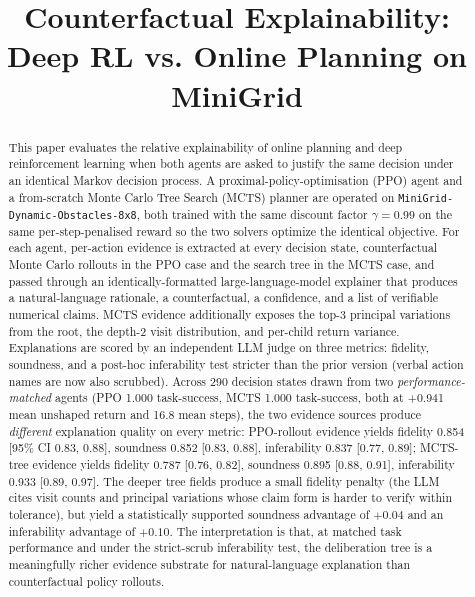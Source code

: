 \documentclass[conference]{IEEEtran}
\begin{document}
\title{Counterfactual Explainability:\\Deep RL vs. Online Planning on MiniGrid}

\author{
\and
{}
}

\maketitle

\begin{abstract}
This paper evaluates the relative explainability of online planning
and deep reinforcement learning when both agents are asked to justify
the same decision under an identical Markov decision process. A
proximal-policy-optimisation (PPO) agent and a from-scratch Monte
Carlo Tree Search (MCTS) planner are operated on
\texttt{MiniGrid-Dynamic-Obstacles-8x8}, both trained with the same
discount factor $\gamma = 0.99$ on the same per-step-penalised reward
so the two solvers optimize the identical objective. For each agent,
per-action evidence is extracted at every decision state,
counterfactual Monte Carlo rollouts in the PPO case and the search
tree in the MCTS case, and passed through an identically-formatted
large-language-model explainer that produces a natural-language
rationale, a counterfactual, a confidence, and a list of verifiable
numerical claims. MCTS evidence additionally exposes the top-3
principal variations from the root, the depth-2 visit distribution,
and per-child return variance. Explanations are scored by an
independent LLM judge on three metrics: fidelity, soundness, and a
post-hoc inferability test stricter than the prior version (verbal
action names are now also scrubbed). Across 290 decision states drawn
from two \emph{performance-matched} agents (PPO 1.000 task-success,
MCTS 1.000 task-success, both at +0.941 mean unshaped return and 16.8
mean steps), the two evidence sources produce \emph{different}
explanation quality on every metric: PPO-rollout evidence yields
fidelity 0.854 [95\% CI 0.83, 0.88], soundness 0.852 [0.83, 0.88],
inferability 0.837 [0.77, 0.89]; MCTS-tree evidence yields fidelity
0.787 [0.76, 0.82], soundness 0.895 [0.88, 0.91], inferability 0.933
[0.89, 0.97]. The deeper tree fields produce a small fidelity
penalty (the LLM cites visit counts and principal variations whose
claim form is harder to verify within tolerance), but yield a
statistically supported soundness advantage of $+0.04$ and an
inferability advantage of $+0.10$. The interpretation is that, at
matched task performance and under the strict-scrub inferability
test, the deliberation tree is a meaningfully richer evidence
substrate for natural-language explanation than counterfactual
policy rollouts.
\end{abstract}
\end{document}
